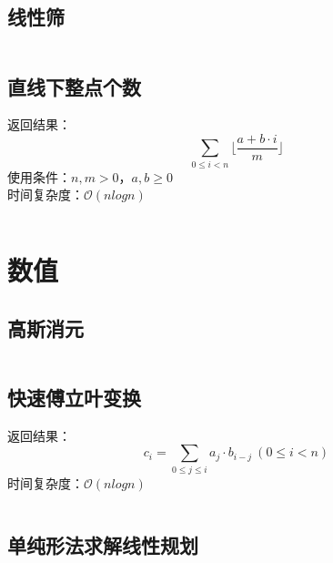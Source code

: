 \documentclass[a4paper]{article}
\newcommand{\cppcode}[1]{
    \inputminted[mathescape,
    frame=lines,linenos]{cpp}{source/#1}
}
\begin{document}
\subsection{线性筛}
\cppcode{number-theory/linear-sieve.cpp}




\subsection{直线下整点个数}

返回结果：$$\sum_{0 \leq i < n} \lfloor \frac{a + b \cdot i}{m} \rfloor$$
\indent 使用条件：$n, m > 0$，$a, b \geq 0$\\
\indent 时间复杂度：$\mathcal{O}(n log n)$

\cppcode{number-theory/lattice-count.cpp}

\section{数值}

\subsection{高斯消元}
\cppcode{numerical-algorithm/Gauss.cpp}

\subsection{快速傅立叶变换}

返回结果：$$c_i=\sum_{0 \leq j \leq i} a_j \cdot b_{i-j} \ (0 \leq i < n)$$
\indent 时间复杂度：$\mathcal{O}(n log n)$

\cppcode{numerical-algorithm/fast-fourier-transform.cpp}

\subsection{单纯形法求解线性规划}
\end{document}

